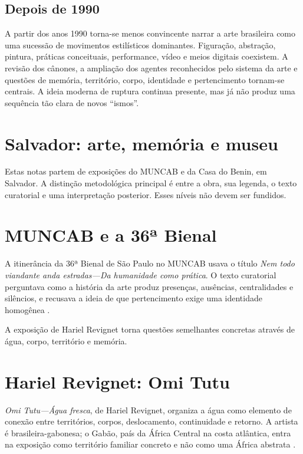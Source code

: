 \subsection{Depois de 1990}
\label{subsection-depois-de-1990}

A partir dos anos 1990 torna-se menos convincente narrar a arte brasileira como
uma sucessão de movimentos estilísticos dominantes. Figuração, abstração,
pintura, práticas conceituais, performance, vídeo e meios digitais coexistem.
A revisão dos cânones, a ampliação dos agentes reconhecidos pelo sistema da arte
e questões de memória, território, corpo, identidade e pertencimento tornam-se
centrais. A ideia moderna de ruptura continua presente, mas já não produz uma
sequência tão clara de novos ``ismos''.


\section{Salvador: arte, memória e museu}
\label{section-arte-salvador-2026}

Estas notas partem de exposições do MUNCAB e
da Casa do Benin, em Salvador.
A distinção metodológica principal é
entre a obra, sua legenda, o
texto curatorial e uma interpretação
posterior. Esses níveis não devem ser
fundidos.

\section{MUNCAB e a 36ª Bienal}
\label{section-muncab-bienal}
A itinerância da 36ª Bienal de São Paulo no
MUNCAB usava o título
\emph{Nem todo viandante anda estradas---Da
humanidade como prática}. O texto
curatorial perguntava como a história da arte
produz presenças, ausências,
centralidades e silêncios, e recusava a ideia
de que pertencimento exige uma
identidade homogênea \cite{muncab2026bienal}.

A exposição de Hariel Revignet torna
questões semelhantes concretas através de
água, corpo, território e memória.

\section{Hariel Revignet: Omi Tutu}
\label{section-hariel-revignet-omi-tutu}
\emph{Omi Tutu---Água fresca}, de Hariel
Revignet, organiza a água como
elemento de conexão entre territórios,
corpos, deslocamento, continuidade e
retorno. A artista é brasileira-gabonesa; o
Gabão, país da África Central na
costa atlântica, entra na exposição como
território familiar concreto e não
como uma África abstrata
\cite{muncab2026omitutu}.

